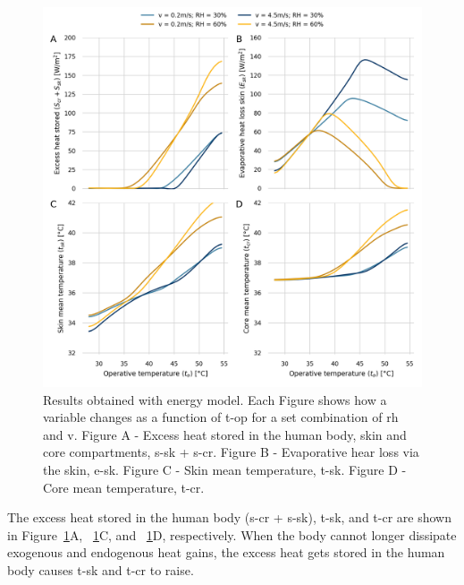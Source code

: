 \begin{figure}[thb!]
    \centering
    \includegraphics[width=\textwidth]{figures/results_model_2}
    \caption{Results obtained with  energy model.
    Each Figure shows how a variable changes as a function of \ac{t-op} for a set combination of \ac{rh} and \ac{v}.
    Figure A - Excess heat stored in the human body, skin and core compartments, \ac{s-sk} + \ac{s-cr}.
    Figure B - Evaporative hear loss via the skin, \ac{e-sk}.
    Figure C - Skin mean temperature, \ac{t-sk}.
    Figure D - Core mean temperature, \ac{t-cr}.}
    \label{fig:results_model_2}
\end{figure}

The excess heat stored in the human body (\acs{s-cr} + \acs{s-sk}), \ac{t-sk}, and \ac{t-cr} are shown in Figure~\ref{fig:results_model_2}A, ~\ref{fig:results_model_2}C, and ~\ref{fig:results_model_2}D, respectively.
When the body cannot longer dissipate exogenous and endogenous heat gains, the excess heat gets stored in the human body causes \ac{t-sk} and \ac{t-cr} to raise.



